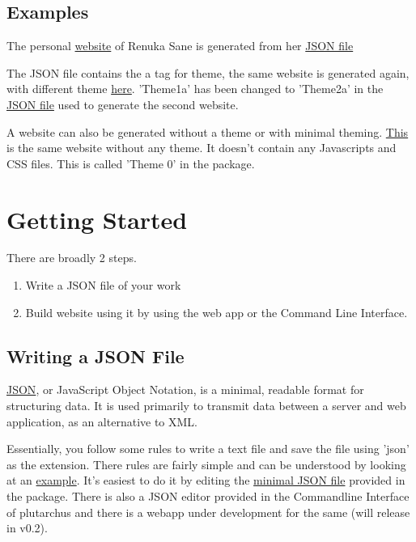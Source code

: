 \documentclass[12pt]{article}
\begin{document}
    \subsection{Examples}

    The personal \href{http://latinplutarchus.com/saner}{website} of Renuka Sane is generated from her \href{http://latinplutarchus/saner_json}{JSON file}

    The JSON file contains the a tag for theme, the same website is generated again, with different theme \href{http://latinplutarchus/saner_json}{here}. 'Theme1a' has been changed to 'Theme2a' in the \href{http://latinplutarchus/saner_json}{JSON file} used to generate the second website.  

    A website can also be generated without a theme or with minimal theming. \href{http://latinplutarchus/saner_json}{This} is the same website without any theme. It doesn't contain any Javascripts and CSS files. This is called 'Theme 0' in the package.  
 

    \section{Getting Started}

    There are broadly 2 steps. 
    \begin{enumerate}
        \item Write a JSON file of your work
        \item Build website using it by using the web app or the Command Line Interface. 
    \end{enumerate}

    \subsection{Writing a JSON File}

    \href{https://developers.squarespace.com/what-is-json}{JSON}, or JavaScript Object Notation, is a minimal, readable format for structuring data. It is used primarily to transmit data between a server and web application, as an alternative to XML.

    Essentially, you follow some rules to write a text file and save the file using 'json' as the extension. There rules are fairly simple and can be understood by looking at an \href{http://latinplutarchus/saner_json}{example}. It's easiest to do it by editing the \href{http://latinplutarchus/saner_json}{minimal JSON file} provided in the package.
    There is also a JSON editor provided in the Commandline Interface of plutarchus and there is a webapp under development for the same (will release in v0.2).  
\end{document}
